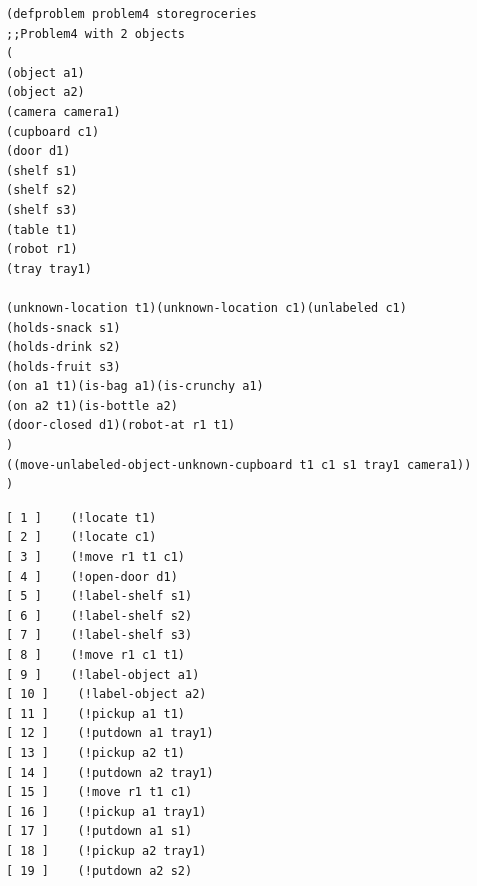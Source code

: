 \documentclass{beamer}
\begin{document}
\begin{lstlisting}
(defproblem problem4 storegroceries
;;Problem4 with 2 objects
(
(object a1)
(object a2)
(camera camera1)
(cupboard c1)
(door d1)
(shelf s1)
(shelf s2)
(shelf s3)
(table t1)
(robot r1)
(tray tray1)

(unknown-location t1)(unknown-location c1)(unlabeled c1)
(holds-snack s1)
(holds-drink s2)
(holds-fruit s3)
(on a1 t1)(is-bag a1)(is-crunchy a1)
(on a2 t1)(is-bottle a2)
(door-closed d1)(robot-at r1 t1)
)
((move-unlabeled-object-unknown-cupboard t1 c1 s1 tray1 camera1))
)
\end{lstlisting}

\textbf{                                }
\textbf{                                }
\textbf{                                }




\begin{lstlisting}
[ 1 ]    (!locate t1)
[ 2 ]    (!locate c1)
[ 3 ]    (!move r1 t1 c1)
[ 4 ]    (!open-door d1)
[ 5 ]    (!label-shelf s1)
[ 6 ]    (!label-shelf s2)
[ 7 ]    (!label-shelf s3)
[ 8 ]    (!move r1 c1 t1)
[ 9 ]    (!label-object a1)
[ 10 ]    (!label-object a2)
[ 11 ]    (!pickup a1 t1)
[ 12 ]    (!putdown a1 tray1)
[ 13 ]    (!pickup a2 t1)
[ 14 ]    (!putdown a2 tray1)
[ 15 ]    (!move r1 t1 c1)
[ 16 ]    (!pickup a1 tray1)
[ 17 ]    (!putdown a1 s1)
[ 18 ]    (!pickup a2 tray1)
[ 19 ]    (!putdown a2 s2)
\end{lstlisting}
\end{document}
